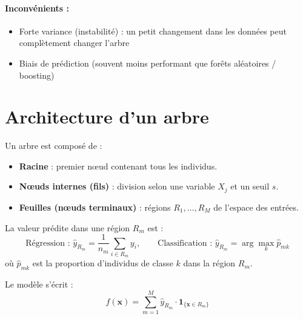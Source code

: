 \documentclass[a4paper,11pt]{article}
\begin{document}
\paragraph{Inconvénients :}
\begin{itemize}
    \item Forte variance (instabilité) : un petit changement dans les données peut complètement changer l'arbre
    \item Biais de prédiction (souvent moins performant que forêts aléatoires / boosting)
\end{itemize}

\section{Architecture d'un arbre}

Un arbre est composé de :
\begin{itemize}
    \item \textbf{Racine} : premier nœud contenant tous les individus.
    \item \textbf{Nœuds internes (fils)} : division selon une variable $X_j$ et un seuil $s$.
    \item \textbf{Feuilles (nœuds terminaux)} : régions $R_1, \ldots, R_M$ de l'espace des entrées.
\end{itemize}

La valeur prédite dans une région $R_m$ est :
\[
\text{Régression : } \hat{y}_{R_m} = \frac{1}{n_m}\sum_{i \in R_m} y_i,\qquad
\text{Classification : } \hat{y}_{R_m} = \arg\max_k \hat{p}_{mk}
\]
où $\hat{p}_{mk}$ est la proportion d'individus de classe $k$ dans la région $R_m$.

Le modèle s'écrit :
\[
f(\mathbf{x}) = \sum_{m=1}^{M} \hat{y}_{R_m} \cdot \mathbf{1}_{\{\mathbf{x} \in R_m\}}
\]
\end{document}
